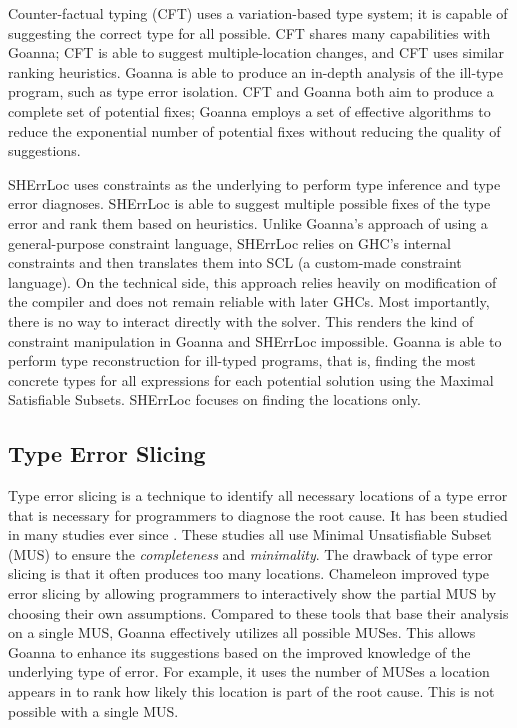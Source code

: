 \documentclass[pdflatex,lineno,sn-nature,Numbered]{sn-jnl}%
\begin{document}
   Counter-factual typing (CFT) \cite{Chen2014-dz,Chen2020-ad} uses a variation-based type system; it is capable of suggesting the correct type for all possible. CFT shares many capabilities with Goanna; CFT is able to suggest multiple-location changes, and CFT uses similar ranking heuristics. Goanna is able to produce an in-depth analysis of the ill-type program, such as type error isolation. CFT and Goanna both aim to produce a complete set of potential fixes; Goanna employs a set of effective algorithms to reduce the exponential number of potential fixes without reducing the quality of suggestions. 
   
   SHErrLoc \cite{Zhang2015-xy} uses constraints as the underlying to perform type inference and type error diagnoses. SHErrLoc is able to suggest multiple possible fixes of the type error and rank them based on heuristics. Unlike Goanna's approach of using a general-purpose constraint language, SHErrLoc relies on GHC's internal constraints and then translates them into SCL (a custom-made constraint language). On the technical side, this approach relies heavily on modification of the compiler and does not remain reliable with later GHCs. Most importantly, there is no way to interact directly with the solver. This renders the kind of constraint manipulation in Goanna and SHErrLoc impossible. Goanna is able to perform type reconstruction for ill-typed programs, that is, finding the most concrete types for all expressions for each potential solution using the Maximal Satisfiable Subsets. SHErrLoc focuses on finding the locations only.


\subsection{Type Error Slicing}

Type error slicing \cite{Haack2004-fr} is a technique to identify all necessary locations of a type error that is necessary for programmers to diagnose the root cause. It has been studied in many studies ever since \cite{Tip2001-qn, Heeren2003-kd}. These studies all use Minimal Unsatisfiable Subset (MUS) to ensure the \textit{completeness} and \textit{minimality}. The drawback of type error slicing is that it often produces too many locations.  Chameleon \cite{Stuckey2003-pz,Fu2021-xd} improved type error slicing by allowing programmers to interactively show the partial MUS by choosing their own assumptions. Compared to these tools that base their analysis on a single MUS, Goanna effectively utilizes all possible MUSes. This allows Goanna to enhance its suggestions based on the improved knowledge of the underlying type of error. For example, it uses the number of MUSes a location appears in to rank how likely this location is part of the root cause. This is not possible with a single MUS.  
\end{document}
